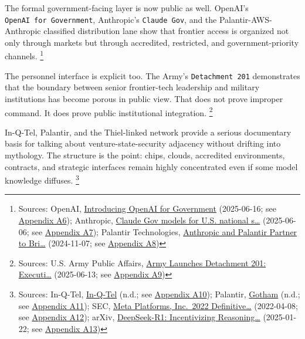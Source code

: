 \documentclass[
  american,
  11pt,
  letterpaper,
]{article}
\begin{document}
The formal government-facing layer is now public as well. OpenAI's
\texttt{OpenAI\ for\ Government}, Anthropic's \texttt{Claude\ Gov}, and
the Palantir-AWS-Anthropic classified distribution lane show that
frontier access is organized not only through markets but through
accredited, restricted, and government-priority channels. \footnote{Sources:
  OpenAI,
  \href{https://openai.com/global-affairs/introducing-openai-for-government/}{Introducing
  OpenAI for Government} (2025-06-16; see
  \hyperref[ch-07-appendix-a6-introducing-openai-for-government]{Appendix
  A6}); Anthropic,
  \href{https://www.anthropic.com/news/claude-gov-models-for-u-s-national-security-customers}{Claude
  Gov models for U.S. national s\ldots{}} (2025-06-06; see
  \hyperref[ch-07-appendix-a7-claude-gov-models-for-u-s-national-security-customers]{Appendix
  A7}); Palantir Technologies,
  \href{https://investors.palantir.com/news-details/2024/Anthropic-and-Palantir-Partner-to-Bring-Claude-AI-Models-to-AWS-for-U.S.-Government-Intelligence-and-Defense-Operations/}{Anthropic
  and Palantir Partner to Bri\ldots{}} (2024-11-07; see
  \hyperref[ch-07-appendix-a8-anthropic-and-palantir-partner-to-bring-claude-ai-models-to-aws-for-u-s-government-intelligence-and-defense-operations]{Appendix
  A8})}

The personnel interface is explicit too. The Army's
\texttt{Detachment\ 201} demonstrates that the boundary between senior
frontier-tech leadership and military institutions has become porous in
public view. That does not prove improper command. It does prove public
institutional integration. \footnote{Sources: U.S. Army Public Affairs,
  \href{https://www.army.mil/article/286317/army_launches_detachment_201_executive_innovation_corps_to_drive_tech_transformation}{Army
  Launches Detachment 201: Executi\ldots{}} (2025-06-13; see
  \hyperref[ch-07-appendix-a9-army-launches-detachment-201-executive-innovation-corps-to-drive-tech-transformation]{Appendix
  A9})}

In-Q-Tel, Palantir, and the Thiel-linked network provide a serious
documentary basis for talking about venture-state-security adjacency
without drifting into mythology. The structure is the point: chips,
clouds, accredited environments, contracts, and strategic interfaces
remain highly concentrated even if some model knowledge diffuses.
\footnote{Sources: In-Q-Tel, \href{https://www.iqt.org/}{In-Q-Tel}
  (n.d.; see \hyperref[ch-07-appendix-a10-in-q-tel]{Appendix A10});
  Palantir, \href{https://www.palantir.com/platforms/gotham/}{Gotham}
  (n.d.; see \hyperref[ch-07-appendix-a11-gotham]{Appendix A11}); SEC,
  \href{https://www.sec.gov/Archives/edgar/data/1326801/000132680122000043/meta2022definitiveproxysta.htm}{Meta
  Platforms, Inc.~2022 Definitive\ldots{}} (2022-04-08; see
  \hyperref[ch-07-appendix-a12-meta-platforms-inc-2022-definitive-proxy-statement]{Appendix
  A12}); arXiv, \href{https://arxiv.org/abs/2501.12948}{DeepSeek-R1:
  Incentivizing Reasoning\ldots{}} (2025-01-22; see
  \hyperref[ch-07-appendix-a13-deepseek-r1-incentivizing-reasoning-capability-in-llms-via-reinforcement-learning]{Appendix
  A13})}
\end{document}
